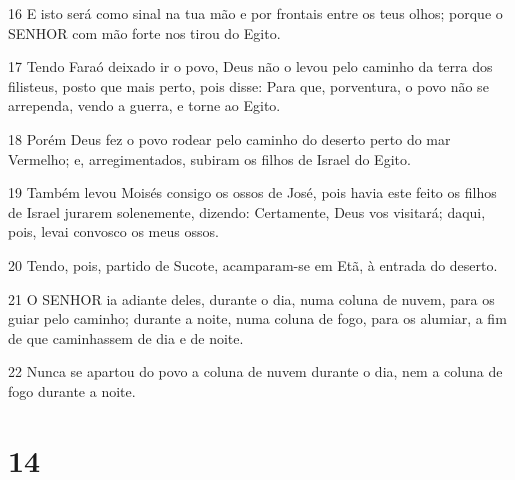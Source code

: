 \par 16 E isto será como sinal na tua mão e por frontais entre os teus olhos; porque o SENHOR com mão forte nos tirou do Egito.
\par 17 Tendo Faraó deixado ir o povo, Deus não o levou pelo caminho da terra dos filisteus, posto que mais perto, pois disse: Para que, porventura, o povo não se arrependa, vendo a guerra, e torne ao Egito.
\par 18 Porém Deus fez o povo rodear pelo caminho do deserto perto do mar Vermelho; e, arregimentados, subiram os filhos de Israel do Egito.
\par 19 Também levou Moisés consigo os ossos de José, pois havia este feito os filhos de Israel jurarem solenemente, dizendo: Certamente, Deus vos visitará; daqui, pois, levai convosco os meus ossos.
\par 20 Tendo, pois, partido de Sucote, acamparam-se em Etã, à entrada do deserto.
\par 21 O SENHOR ia adiante deles, durante o dia, numa coluna de nuvem, para os guiar pelo caminho; durante a noite, numa coluna de fogo, para os alumiar, a fim de que caminhassem de dia e de noite.
\par 22 Nunca se apartou do povo a coluna de nuvem durante o dia, nem a coluna de fogo durante a noite.

\chapter{14}

